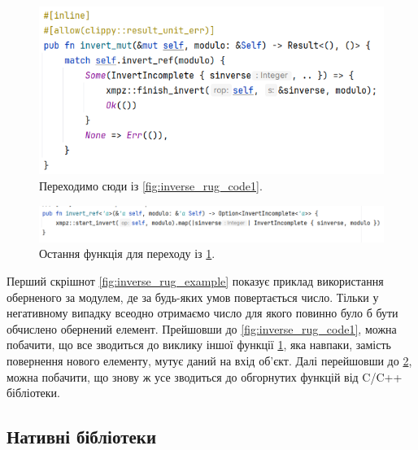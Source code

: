 \begin{itemize}
	\begin{figure}[!h]
    		\centering
    		\includegraphics[scale = 0.45]{IMAGES/Rust/inverse_rug_code2}
    		\caption{Переходимо сюди із \ref{fig:inverse_rug_code1}.}
    		\label{fig:inverse_rug_code2}
	\end{figure}
	
	\begin{figure}[!h]
    		\centering
    		\includegraphics[scale = 0.45]{IMAGES/Rust/inverse_rug_code3}
    		\caption{Остання функція для переходу із \ref{fig:inverse_rug_code2}.}
    		\label{fig:inverse_rug_code3}
	\end{figure}
	
	Перший скрішнот \ref{fig:inverse_rug_example} показує приклад використання оберненого за модулем, де за будь-яких умов повертається число. Тільки у негативному випадку всеодно отримаємо число для якого повинно було б бути обчислено обернений елемент. Прейшовши до \ref{fig:inverse_rug_code1}, можна побачити, що все зводиться до виклику іншої функції \ref{fig:inverse_rug_code2}, яка навпаки, замість повернення нового елементу, мутує даний на вхід об'єкт. Далі перейшовши до \ref{fig:inverse_rug_code3}, можна побачити, що знову ж усе зводиться до обгорнутих функцій від C/C++ бібліотеки. 
	
\end{itemize}

\subsection{Нативні бібліотеки}

